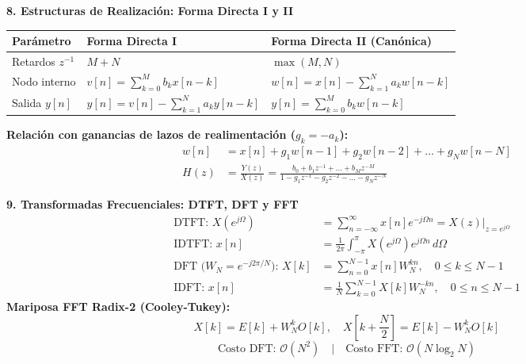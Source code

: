 \documentclass[10pt, a4paper, twocolumn]{article}
\begin{document}
\vspace{2pt}
\textbf{8. Estructuras de Realización: Forma Directa I y II}

{\scriptsize
\setlength{\tabcolsep}{2.5pt}
\renewcommand{\arraystretch}{1.25}
\begin{tabular}{@{}lll@{}}
\toprule
\textbf{Parámetro} & \textbf{Forma Directa I} & \textbf{Forma Directa II (Canónica)} \\
\midrule
Retardos $z^{-1}$ & $M + N$ & $\max(M, N)$ \\
Nodo interno & $v[n] = \sum_{k=0}^{M} b_k x[n-k]$ & $w[n] = x[n] - \sum_{k=1}^{N} a_k w[n-k]$ \\
Salida $y[n]$ & $y[n] = v[n] - \sum_{k=1}^{N} a_k y[n-k]$ & $y[n] = \sum_{k=0}^{M} b_k w[n-k]$ \\
\bottomrule
\end{tabular}
}
\textbf{Relación con ganancias de lazos de realimentación ($g_k = -a_k$):}
\begin{align*}
    w[n] &= x[n] + g_1 w[n-1] + g_2 w[n-2] + \dots + g_N w[n-N] \\
    H(z) &= \frac{Y(z)}{X(z)} = \frac{b_0 + b_1 z^{-1} + \dots + b_M z^{-M}}{1 - g_1 z^{-1} - g_2 z^{-2} - \dots - g_N z^{-N}}
\end{align*}

\vspace{2pt}
\textbf{9. Transformadas Frecuenciales: DTFT, DFT y FFT}
\begin{align*}
    \text{DTFT: } X(e^{j\Omega}) &= \sum_{n=-\infty}^{\infty} x[n] e^{-j\Omega n} = X(z)\Big|_{z = e^{j\Omega}} \\
    \text{IDTFT: } x[n] &= \frac{1}{2\pi} \int_{-\pi}^{\pi} X(e^{j\Omega}) e^{j\Omega n} \, d\Omega \\
    \text{DFT ($W_N = e^{-j 2\pi / N}$): } X[k] &= \sum_{n=0}^{N-1} x[n] W_N^{k n}, \quad 0 \le k \le N-1 \\
    \text{IDFT: } x[n] &= \frac{1}{N} \sum_{k=0}^{N-1} X[k] W_N^{-k n}, \quad 0 \le n \le N-1
\end{align*}
\textbf{Mariposa FFT Radix-2 (Cooley-Tukey):}
\[
    X[k] = E[k] + W_N^k O[k], \quad X\left[k + \frac{N}{2}\right] = E[k] - W_N^k O[k]
\]
\[
    \text{Costo DFT: } \mathcal{O}(N^2) \quad \big| \quad \text{Costo FFT: } \mathcal{O}(N \log_2 N)
\]
\end{document}
